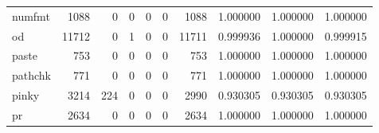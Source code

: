\begin{tabular}{lrrrrrrrrr}
numfmt    &                                               1088 &                                                  0 &                                                  0 &                                                  0 &                                                  0 &                                               1088 &                                           1.000000 &                               1.000000 &                             1.000000 \\
od        &                                              11712 &                                                  0 &                                                  1 &                                                  0 &                                                  0 &                                              11711 &                                           0.999936 &                               1.000000 &                             0.999915 \\
paste     &                                                753 &                                                  0 &                                                  0 &                                                  0 &                                                  0 &                                                753 &                                           1.000000 &                               1.000000 &                             1.000000 \\
pathchk   &                                                771 &                                                  0 &                                                  0 &                                                  0 &                                                  0 &                                                771 &                                           1.000000 &                               1.000000 &                             1.000000 \\
pinky     &                                               3214 &                                                224 &                                                  0 &                                                  0 &                                                  0 &                                               2990 &                                           0.930305 &                               0.930305 &                             0.930305 \\
pr        &                                               2634 &                                                  0 &                                                  0 &                                                  0 &                                                  0 &                                               2634 &                                           1.000000 &                               1.000000 &                             1.000000 \\

\end{tabular}
